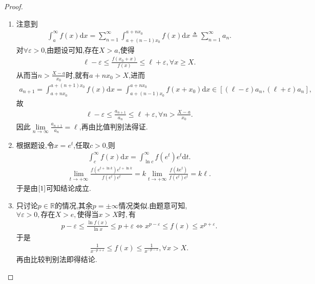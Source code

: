 \documentclass[../../main.tex]{subfiles}
\begin{document}
\begin{proof}
\begin{enumerate}[(1)]
\item 注意到
\begin{align*}
\int_a^{\infty}{f\left( x \right) \mathrm{d}x}=\sum_{n=1}^{\infty}{\int_{a+\left( n-1 \right) x_0}^{a+nx_0}{f\left( x \right) \mathrm{d}x}}\triangleq \sum_{n=1}^{\infty}{a_n}.
\end{align*}
对$\forall \varepsilon >0$,由题设可知,存在$X>a$,使得
\begin{align*}
\ell -\varepsilon \leqslant \frac{f\left( x_0+x \right)}{f\left( x \right)}\leqslant \ell +\varepsilon ,\forall x\geqslant X.
\end{align*}
从而当$n>\frac{X-a}{x_0}$时,就有$a+nx_0>X$,进而
\begin{align*}
a_{n+1}=\int_{a+nx_0}^{a+\left( n+1 \right) x_0}{f\left( x \right) \mathrm{d}x}=\int_{a+\left( n-1 \right) x_0}^{a+nx_0}{f\left( x+x_0 \right) \mathrm{d}x}\in \left[ \left( \ell -\varepsilon \right) a_n,\left( \ell +\varepsilon \right) a_n \right] ,
\end{align*}
故
\begin{align*}
\ell -\varepsilon \leqslant \frac{a_{n+1}}{a_n}\leqslant \ell +\varepsilon ,\forall n>\frac{X-a}{x_0}.
\end{align*}
因此$\underset{n\rightarrow \infty}{\lim}\frac{a_{n+1}}{a_n}=\ell$,再由比值判别法得证.

\item 根据题设,令$x=e^t$,任取$c>0$,则
\begin{align*}
\int_c^{\infty}{f\left( x \right) \mathrm{d}x}=\int_{\ln c}^{\infty}{f\left( e^t \right) e^t\mathrm{d}t}.
\end{align*}
\begin{align*}
\underset{t\rightarrow +\infty}{\lim}\frac{f\left( e^{t+\ln k} \right) e^{t+\ln k}}{f\left( e^t \right) e^t}=k\underset{t\rightarrow +\infty}{\lim}\frac{f\left( ke^t \right)}{f\left( e^t \right) e^t}=k\ell .
\end{align*}
于是由$\eqref{1}$可知结论成立.

\item 只讨论$p\in \mathbb{R}$的情况,其余$p=\pm \infty$情况类似.由题意可知,$\forall \varepsilon >0,\text{存在}X>e,\text{使得当}x>X\text{时},\text{有}$
\begin{align*}
p-\varepsilon \leqslant \frac{\ln f\left( x \right)}{\ln x}\leqslant p+\varepsilon \Longleftrightarrow x^{p-\varepsilon}\leqslant f\left( x \right) \leqslant x^{p+\varepsilon}.
\end{align*}
于是
\begin{align*}
\frac{1}{x^{-p+\varepsilon}}\leqslant f\left( x \right) \leqslant \frac{1}{x^{-p-\varepsilon}},\forall x>X.
\end{align*}
再由比较判别法即得结论.
\end{enumerate}
\end{proof}
\end{document}
